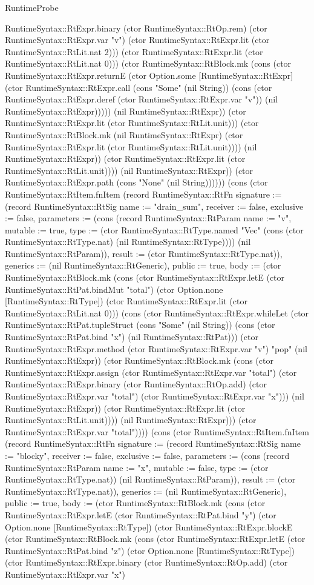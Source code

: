 \begin{lexlean}{RuntimeProbe}
\begin{semanticmodule}
{RuntimeSyntax::RtExpr.binary (ctor RuntimeSyntax::RtOp.rem) (ctor RuntimeSyntax::RtExpr.var "v") (ctor RuntimeSyntax::RtExpr.lit (ctor RuntimeSyntax::RtLit.nat 2))) (ctor RuntimeSyntax::RtExpr.lit (ctor RuntimeSyntax::RtLit.nat 0))) (ctor RuntimeSyntax::RtBlock.mk (cons (ctor RuntimeSyntax::RtExpr.returnE (ctor Option.some [RuntimeSyntax::RtExpr] (ctor RuntimeSyntax::RtExpr.call (cons "Some" (nil String)) (cons (ctor RuntimeSyntax::RtExpr.deref (ctor RuntimeSyntax::RtExpr.var "v")) (nil RuntimeSyntax::RtExpr))))) (nil RuntimeSyntax::RtExpr)) (ctor RuntimeSyntax::RtExpr.lit (ctor RuntimeSyntax::RtLit.unit))) (ctor RuntimeSyntax::RtBlock.mk (nil RuntimeSyntax::RtExpr) (ctor RuntimeSyntax::RtExpr.lit (ctor RuntimeSyntax::RtLit.unit)))) (nil RuntimeSyntax::RtExpr)) (ctor RuntimeSyntax::RtExpr.lit (ctor RuntimeSyntax::RtLit.unit)))) (nil RuntimeSyntax::RtExpr)) (ctor RuntimeSyntax::RtExpr.path (cons "None" (nil String))))})) (cons (ctor RuntimeSyntax::RtItem.fnItem (record RuntimeSyntax::RtFn {signature := (record RuntimeSyntax::RtSig {name := "drain_sum", receiver := false, exclusive := false, parameters := (cons (record RuntimeSyntax::RtParam {name := "v", mutable := true, type := (ctor RuntimeSyntax::RtType.named "Vec" (cons (ctor RuntimeSyntax::RtType.nat) (nil RuntimeSyntax::RtType)))}) (nil RuntimeSyntax::RtParam)), result := (ctor RuntimeSyntax::RtType.nat)}), generics := (nil RuntimeSyntax::RtGeneric), public := true, body := (ctor RuntimeSyntax::RtBlock.mk (cons (ctor RuntimeSyntax::RtExpr.letE (ctor RuntimeSyntax::RtPat.bindMut "total") (ctor Option.none [RuntimeSyntax::RtType]) (ctor RuntimeSyntax::RtExpr.lit (ctor RuntimeSyntax::RtLit.nat 0))) (cons (ctor RuntimeSyntax::RtExpr.whileLet (ctor RuntimeSyntax::RtPat.tupleStruct (cons "Some" (nil String)) (cons (ctor RuntimeSyntax::RtPat.bind "x") (nil RuntimeSyntax::RtPat))) (ctor RuntimeSyntax::RtExpr.method (ctor RuntimeSyntax::RtExpr.var "v") "pop" (nil RuntimeSyntax::RtExpr)) (ctor RuntimeSyntax::RtBlock.mk (cons (ctor RuntimeSyntax::RtExpr.assign (ctor RuntimeSyntax::RtExpr.var "total") (ctor RuntimeSyntax::RtExpr.binary (ctor RuntimeSyntax::RtOp.add) (ctor RuntimeSyntax::RtExpr.var "total") (ctor RuntimeSyntax::RtExpr.var "x"))) (nil RuntimeSyntax::RtExpr)) (ctor RuntimeSyntax::RtExpr.lit (ctor RuntimeSyntax::RtLit.unit)))) (nil RuntimeSyntax::RtExpr))) (ctor RuntimeSyntax::RtExpr.var "total"))})) (cons (ctor RuntimeSyntax::RtItem.fnItem (record RuntimeSyntax::RtFn {signature := (record RuntimeSyntax::RtSig {name := "blocky", receiver := false, exclusive := false, parameters := (cons (record RuntimeSyntax::RtParam {name := "x", mutable := false, type := (ctor RuntimeSyntax::RtType.nat)}) (nil RuntimeSyntax::RtParam)), result := (ctor RuntimeSyntax::RtType.nat)}), generics := (nil RuntimeSyntax::RtGeneric), public := true, body := (ctor RuntimeSyntax::RtBlock.mk (cons (ctor RuntimeSyntax::RtExpr.letE (ctor RuntimeSyntax::RtPat.bind "y") (ctor Option.none [RuntimeSyntax::RtType]) (ctor RuntimeSyntax::RtExpr.blockE (ctor RuntimeSyntax::RtBlock.mk (cons (ctor RuntimeSyntax::RtExpr.letE (ctor RuntimeSyntax::RtPat.bind "z") (ctor Option.none [RuntimeSyntax::RtType]) (ctor RuntimeSyntax::RtExpr.binary (ctor RuntimeSyntax::RtOp.add) (ctor RuntimeSyntax::RtExpr.var "x") }
\end{semanticmodule}
\end{lexlean}
